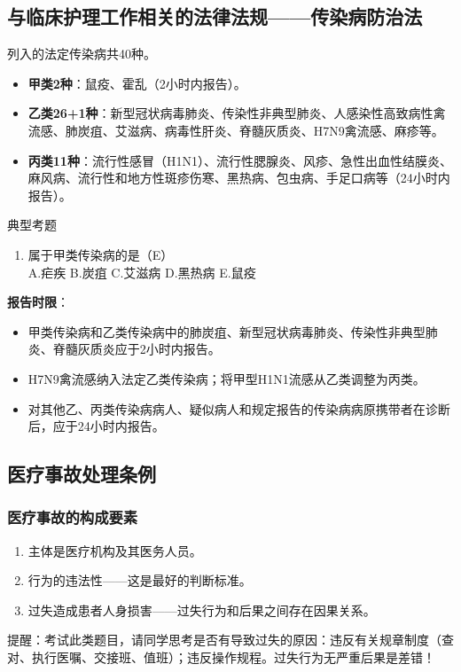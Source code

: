 \documentclass[11pt, a4paper]{ctexart}
\begin{document}
\subsection{与临床护理工作相关的法律法规——传染病防治法}
列入的法定传染病共40种。
\begin{itemize}
    \item \textbf{甲类2种}：鼠疫、霍乱（2小时内报告）。
    \item \textbf{乙类26+1种}：新型冠状病毒肺炎、传染性非典型肺炎、人感染性高致病性禽流感、肺炭疽、艾滋病、病毒性肝炎、脊髓灰质炎、H7N9禽流感、麻疹等。
    \item \textbf{丙类11种}：流行性感冒（H1N1）、流行性腮腺炎、风疹、急性出血性结膜炎、麻风病、流行性和地方性斑疹伤寒、黑热病、包虫病、手足口病等（24小时内报告）。
\end{itemize}

\begin{examplebox}{典型考题}
\begin{enumerate}
    \item 属于甲类传染病的是（E）\\
    A.疟疾 \quad B.炭疽 \quad C.艾滋病 \quad D.黑热病 \quad E.鼠疫
\end{enumerate}
\end{examplebox}

\textbf{报告时限}：
\begin{itemize}
    \item 甲类传染病和乙类传染病中的肺炭疽、新型冠状病毒肺炎、传染性非典型肺炎、脊髓灰质炎应于2小时内报告。
    \item H7N9禽流感纳入法定乙类传染病；将甲型H1N1流感从乙类调整为丙类。
    \item 对其他乙、丙类传染病病人、疑似病人和规定报告的传染病病原携带者在诊断后，应于24小时内报告。
\end{itemize}

\subsection{医疗事故处理条例}
\subsubsection{医疗事故的构成要素}
\begin{enumerate}
    \item 主体是医疗机构及其医务人员。
    \item 行为的违法性——这是最好的判断标准。
    \item 过失造成患者人身损害——过失行为和后果之间存在因果关系。
\end{enumerate}
提醒：考试此类题目，请同学思考是否有导致过失的原因：违反有关规章制度（查对、执行医嘱、交接班、值班）；违反操作规程。过失行为无严重后果是差错！
\end{document}
